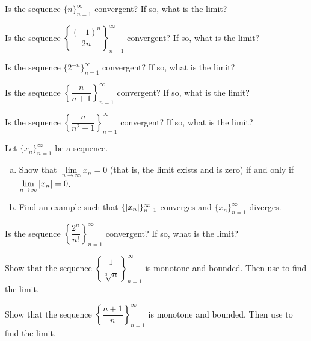 \begin{exercise}
Is the sequence
$\{ n \}_{n=1}^\infty$
convergent?  If so, what is the limit?
\end{exercise}

\begin{exercise}
Is the sequence
$\left\{ \dfrac{{(-1)}^n}{2n} \right\}_{n=1}^\infty$
convergent?  If so, what is the limit?
\end{exercise}

\begin{exercise}
Is the sequence
$\{ 2^{-n} \}_{n=1}^\infty$
convergent?  If so, what is the limit?
\end{exercise}

\begin{exercise}
Is the sequence
$\left\{ \dfrac{n}{n+1} \right\}_{n=1}^\infty$
convergent?  If so, what is the limit?
\end{exercise}

\begin{exercise}
Is the sequence
$\left\{ \dfrac{n}{n^2+1} \right\}_{n=1}^\infty$
convergent?  If so, what is the limit?
\end{exercise}

\begin{exercise} \label{exercise:absconv}
Let $\{ x_n \}_{n=1}^\infty$ be a sequence.
\begin{enumerate}[a)]
\item Show that $\lim\limits_{n\to\infty} x_n = 0$ (that is, the limit exists and is zero)
if and only if $\lim\limits_{n\to\infty} \left\lvert {x_n} \right\rvert = 0$.
\item Find an example such that $\{ \left\lvert {x_n} \right\rvert \}_{n=1}^\infty$ converges and
$\{ x_n \}_{n=1}^\infty$
diverges.
\end{enumerate}
\end{exercise}

\begin{exercise}
Is the sequence
$\left\{ \dfrac{2^n}{n!} \right\}_{n=1}^\infty$
convergent?  If so, what is the limit?
\end{exercise}

\begin{exercise}
Show that the sequence
$\left\{ \dfrac{1}{\sqrt[3]{n}} \right\}_{n=1}^\infty$ is monotone and bounded.  Then use
 to find the limit.
\end{exercise}

\begin{exercise}
Show that the sequence
$\left\{ \dfrac{n+1}{n} \right\}_{n=1}^\infty$
is monotone and bounded.  Then use
 to find the limit.
\end{exercise}

